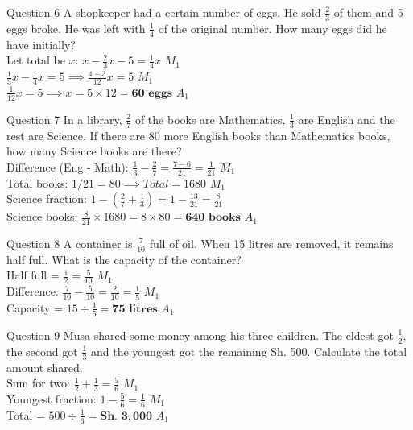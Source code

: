 \documentclass[12pt, a4paper, oneside]{article}
\begin{document}
\begin{solvingbox}{Question 6}
A shopkeeper had a certain number of eggs. He sold $\frac{2}{3}$ of them and 5 eggs broke. He was left with $\frac{1}{4}$ of the original number. How many eggs did he have initially? \\
Let total be $x$: $x - \frac{2}{3}x - 5 = \frac{1}{4}x$ \hfill $M_1$ \\
$\frac{1}{3}x - \frac{1}{4}x = 5 \implies \frac{4-3}{12}x = 5$ \hfill $M_1$ \\
$\frac{1}{12}x = 5 \implies x = 5 \times 12 = \mathbf{60\text{ eggs}}$ \hfill $A_1$
\end{solvingbox}

\begin{solvingbox}{Question 7}
In a library, $\frac{2}{7}$ of the books are Mathematics, $\frac{1}{3}$ are English and the rest are Science. If there are 80 more English books than Mathematics books, how many Science books are there? \\
Difference (Eng - Math): $\frac{1}{3} - \frac{2}{7} = \frac{7 - 6}{21} = \frac{1}{21}$ \hfill $M_1$ \\
Total books: $1/21 = 80 \implies Total = 1680$ \hfill $M_1$ \\
Science fraction: $1 - (\frac{2}{7} + \frac{1}{3}) = 1 - \frac{13}{21} = \frac{8}{21}$ \\
Science books: $\frac{8}{21} \times 1680 = 8 \times 80 = \mathbf{640\text{ books}}$ \hfill $A_1$
\end{solvingbox}

\begin{solvingbox}{Question 8}
A container is $\frac{7}{10}$ full of oil. When 15 litres are removed, it remains half full. What is the capacity of the container? \\
Half full = $\frac{1}{2} = \frac{5}{10}$ \hfill $M_1$ \\
Difference: $\frac{7}{10} - \frac{5}{10} = \frac{2}{10} = \frac{1}{5}$ \hfill $M_1$ \\
Capacity = $15 \div \frac{1}{5} = \mathbf{75\text{ litres}}$ \hfill $A_1$
\end{solvingbox}

\begin{solvingbox}{Question 9}
Musa shared some money among his three children. The eldest got $\frac{1}{2}$, the second got $\frac{1}{3}$ and the youngest got the remaining Sh. 500. Calculate the total amount shared. \\
Sum for two: $\frac{1}{2} + \frac{1}{3} = \frac{5}{6}$ \hfill $M_1$ \\
Youngest fraction: $1 - \frac{5}{6} = \frac{1}{6}$ \hfill $M_1$ \\
Total = $500 \div \frac{1}{6} = \mathbf{\text{Sh. } 3,000}$ \hfill $A_1$
\end{solvingbox}
\end{document}
